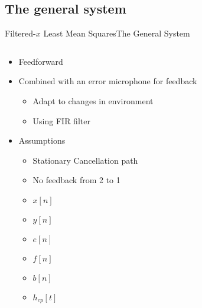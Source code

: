 \subsection{The general system}
\begin{frame}{Filtered-$x$ Least Mean Squares}{The General System}
	\begin{columns}
		\begin{column}{0.5\textwidth}		

		\begin{itemize}
		\item Feedforward
		\item Combined with an error microphone for feedback
		\begin{itemize}
		\item Adapt to changes in environment
		\item Using FIR filter		
		\end{itemize}
		\item Assumptions
		\begin{itemize}
		\item Stationary Cancellation path
		\item No feedback from 2 to 1
		\end{itemize}

		\begin{itemize}
			\setlength{\itemindent}{4em}
			\item[Input] $x[n]$
			\item[Output]$y[n]$
			\item[Error] $e[n]$	
			\item[Filtered x] $f[n]$
			\item[Filter coefficients] $b[n]$	
			\item[Cancellation Path] $h_{cp}[t]$		
		\end{itemize}

		\end{itemize}

		
		\end{column}
		\begin{column}{0.5\textwidth}
		\resizebox{1.1\columnwidth}{!}{	
		
		}
		\end{column}
	\end{columns}
\end{frame}


